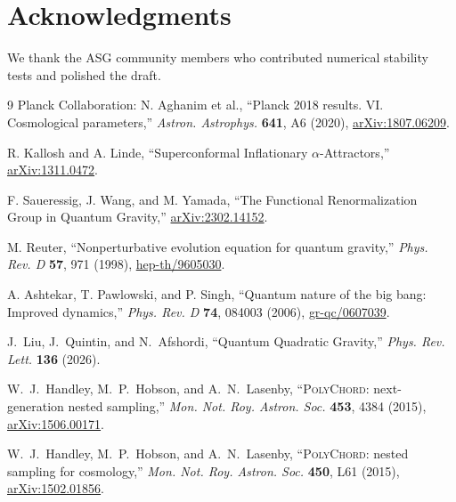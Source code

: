 \documentclass[11pt,a4paper]{article}
\begin{document}
\section*{Acknowledgments}
We thank the ASG community members who contributed numerical stability tests and polished the draft.

\begin{thebibliography}{9}
Planck Collaboration: N. Aghanim et al., ``Planck 2018 results. VI. Cosmological parameters,'' \textit{Astron. Astrophys.} \textbf{641}, A6 (2020), \href{https://arxiv.org/abs/1807.06209}{arXiv:1807.06209}.

R. Kallosh and A. Linde, ``Superconformal Inflationary $\alpha$-Attractors,'' \href{https://arxiv.org/abs/1311.0472}{arXiv:1311.0472}.

F. Saueressig, J. Wang, and M. Yamada, ``The Functional Renormalization Group in Quantum Gravity,'' \href{https://arxiv.org/abs/2302.14152}{arXiv:2302.14152}.

M. Reuter, ``Nonperturbative evolution equation for quantum gravity,'' \textit{Phys. Rev. D} \textbf{57}, 971 (1998), \href{https://arxiv.org/abs/hep-th/9605030}{hep-th/9605030}.

A. Ashtekar, T. Pawlowski, and P. Singh, ``Quantum nature of the big bang: Improved dynamics,'' \textit{Phys. Rev. D} \textbf{74}, 084003 (2006), \href{https://arxiv.org/abs/gr-qc/0607039}{gr-qc/0607039}.

J.~Liu, J.~Quintin, and N.~Afshordi, ``Quantum Quadratic Gravity,'' \textit{Phys. Rev. Lett.} \textbf{136} (2026).

W.~J.~Handley, M.~P.~Hobson, and A.~N.~Lasenby, ``\textsc{PolyChord}: next-generation nested sampling,'' \textit{Mon. Not. Roy. Astron. Soc.} \textbf{453}, 4384 (2015), \href{https://arxiv.org/abs/1506.00171}{arXiv:1506.00171}.

W.~J.~Handley, M.~P.~Hobson, and A.~N.~Lasenby, ``\textsc{PolyChord}: nested sampling for cosmology,'' \textit{Mon. Not. Roy. Astron. Soc.} \textbf{450}, L61 (2015), \href{https://arxiv.org/abs/1502.01856}{arXiv:1502.01856}.
\end{thebibliography}
\end{document}
